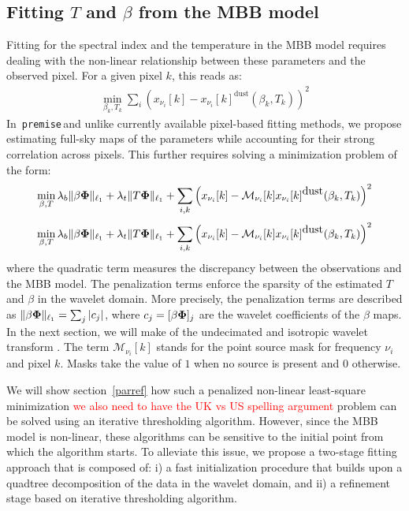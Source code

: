 \documentclass[a4paper,fleqn,usenatbib]{mnras}
\newcommand{\premise}{\texttt{premise}}
\begin{document}
\subsection{Fitting $T$ and $\beta$ from the MBB model}
Fitting for the spectral index and the temperature in the MBB model requires dealing with the non-linear relationship between these parameters and the observed pixel. For a given pixel $k$, this reads as:
\begin{eqnarray}
\min_{\beta_k,T_k}  \sum_{i} \left({x}_{\nu_i}[k] - { x}_{\nu_i}[k]^{\mbox{dust}}(\beta_k,T_k) \right)^2
\label{eq:pixfit}
\end{eqnarray}
In\, \premise \,and unlike currently available pixel-based fitting methods, we propose estimating full-sky maps of the parameters while accounting for their strong correlation across pixels. This further requires solving a minimization problem of the form:
\begin{equation}
\min_{\beta,T} \lambda_b \| \beta {\bf \Phi}\|_{\ell_1} + \lambda_t \| T {\bf \Phi}\|_{\ell_1} + \sum_{i,k} \left({x}_{\nu_i}[k] - \mathcal{M}_{\nu_i}[k] { x}_{\nu_i}[k]^{\mbox{dust}}(\beta_k,T_k) \right)^2
\end{equation}
\begin{equation}
\min_{\beta,T} \lambda_b \| \beta {\bf \Phi}\|_{\ell_1} + \lambda_t \| T {\bf \Phi}\|_{\ell_1} + \sum_{i,k} \left({x}_{\nu_i}[k] - \mathcal{M}_{\nu_i}[k] { x}_{\nu_i}[k]^{\mbox{dust}}(\beta_k,T_k) \right)^2
\label{eq:cost_function}
\end{equation}
where the quadratic term measures the discrepancy between the observations and the MBB model. The penalization terms enforce the sparsity of the estimated $T$ and $\beta$ in the wavelet domain. More precisely, the penalization terms are described as $\| \beta {\bf \Phi}\|_{\ell_1} = \sum_j | c_j|$, where  $c_j = [\beta {\bf \Phi}]_j$ are the wavelet coefficients of the $\beta$ maps. In the next section, we will make of the undecimated and isotropic wavelet transform \citep{starck2007undecimated}. The term $\mathcal{M}_{\nu_i}[k]$ stands for the point source mask for frequency $\nu_i$ and pixel $k$. Masks take the value of $1$ when no source is present and $0$ otherwise.

We will show section~\ref{parref} how such a penalized non-linear least-square minimization \textcolor{red}{we also need to have the UK vs US spelling argument} problem can be solved using an iterative thresholding algorithm. However, since the MBB model is non-linear, these algorithms can be sensitive to the initial point from which the algorithm starts. To alleviate this issue, we propose a two-stage fitting approach that is composed of: i) a fast initialization procedure that builds upon a quadtree decomposition of the data in the wavelet domain, and ii) a refinement stage based on iterative thresholding algorithm.
\end{document}

